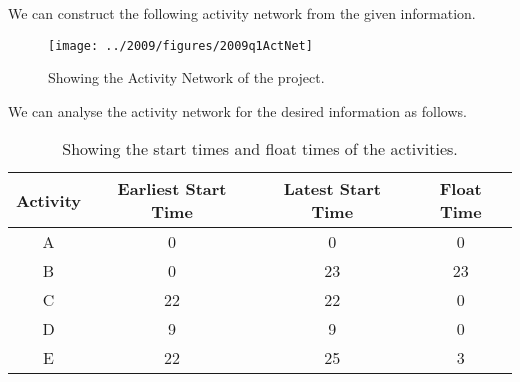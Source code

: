 %
%

\begin{subquestions}


\subquestion

We can construct the following activity network from the given information.
\begin{figure}[H]
	\begin{center}
		\texttt{[image: ../2009/figures/2009q1ActNet]}
		\caption{\label{2001:q1:fig:ActNet} Showing the Activity Network of the project.}
	\end{center}
\end{figure}


\subquestion

We can analyse the activity network for the desired information as follows.
\begin{table}[H]
	\centering
	\begin{tabular}{|c|c|c|c|}
		\hline
		Activity & Earliest Start Time & Latest Start Time & Float Time \\
		\hline
		A & 0 & 0 & 0 \\
		B & 0 & 23 & 23 \\ 
		C & 22 & 22 & 0 \\
		D & 9 & 9 & 0 \\
		E & 22 & 25 & 3 \\
		\hline
	\end{tabular}
	\caption{\label{2009:q1:tab:CritPath} Showing the start times and float times of the activities.}
\end{table}


\end{subquestions}
